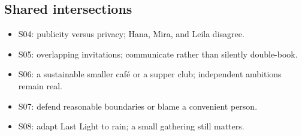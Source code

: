 \documentclass[11pt]{article}
\begin{document}
\subsection*{Shared intersections}
\begin{itemize}\item S04: publicity versus privacy; Hana, Mira, and Leila disagree.\item S05: overlapping invitations; communicate rather than silently double-book.\item S06: a sustainable smaller caf\'e or a supper club; independent ambitions remain real.\item S07: defend reasonable boundaries or blame a convenient person.\item S08: adapt Last Light to rain; a small gathering still matters.\end{itemize}
\newpage
\end{document}
